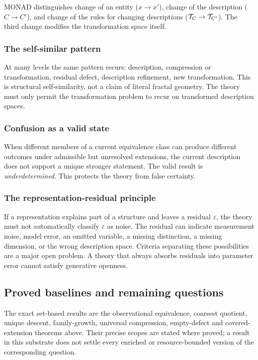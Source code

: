 MONAD distinguishes change of an entity ($x \to x'$), change
of the description ($C \to C'$), and change of the rules for changing
descriptions ($\mathcal{T}_C \to \mathcal{T}_{C'}$). The third
change modifies the transformation space itself.

\subsubsection{The self-similar pattern}

At many levels the same pattern recurs: description, compression or
transformation, residual defect, description refinement, new
transformation. This is structural self-similarity, not a claim of
literal fractal geometry. The theory must only permit the
transformation problem to recur on transformed description spaces.

\subsubsection{Confusion as a valid state}

When different members of a current equivalence class can produce
different outcomes under admissible but unresolved extensions, the
current description does not support a unique stronger statement. The
valid result is \emph{underdetermined}. This protects the theory from
false certainty.

\subsubsection{The representation-residual principle}

If a representation explains part of a structure and leaves a residual
$\varepsilon$, the theory must not automatically classify
$\varepsilon$ as noise. The residual can indicate measurement noise,
model error, an omitted variable, a missing distinction, a missing
dimension, or the wrong description space. Criteria separating these
possibilities are a major open problem. A theory that always absorbs
residuals into parameter error cannot satisfy generative openness.

\subsection{Proved baselines and remaining questions}

The exact set-based results are the observational equivalence,
coarsest quotient, unique descent, family-growth, universal compression,
empty-defect and covered-extension theorems above. Their precise scopes
are stated where proved; a result in this substrate does not settle
every enriched or resource-bounded version of the corresponding question.

